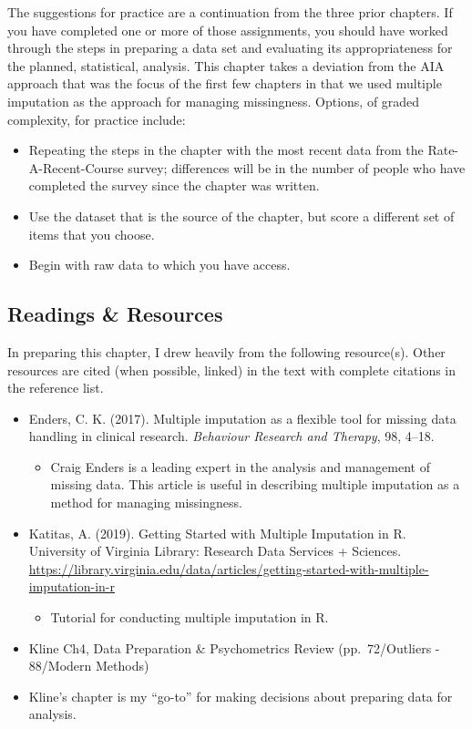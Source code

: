 \documentclass[
  11pt,
]{book}
\providecommand{\tightlist}{%
  \setlength{\itemsep}{0pt}\setlength{\parskip}{0pt}}
\begin{document}
The suggestions for practice are a continuation from the three prior chapters. If you have completed one or more of those assignments, you should have worked through the steps in preparing a data set and evaluating its appropriateness for the planned, statistical, analysis. This chapter takes a deviation from the AIA \citep{parent_handling_2013} approach that was the focus of the first few chapters in that we used multiple imputation as the approach for managing missingness. Options, of graded complexity, for practice include:

\begin{itemize}
\tightlist
\item
  Repeating the steps in the chapter with the most recent data from the Rate-A-Recent-Course survey; differences will be in the number of people who have completed the survey since the chapter was written.
\item
  Use the dataset that is the source of the chapter, but score a different set of items that you choose.
\item
  Begin with raw data to which you have access.
\end{itemize}

\hypertarget{readings-resources-3}{%
\subsection{Readings \& Resources}\label{readings-resources-3}}

In preparing this chapter, I drew heavily from the following resource(s). Other resources are cited (when possible, linked) in the text with complete citations in the reference list.

\begin{itemize}
\tightlist
\item
  Enders, C. K. (2017). Multiple imputation as a flexible tool for missing data handling in clinical research. \emph{Behaviour Research and Therapy}, 98, 4--18.

  \begin{itemize}
  \tightlist
  \item
    Craig Enders is a leading expert in the analysis and management of missing data. This article is useful in describing multiple imputation as a method for managing missingness.
  \end{itemize}
\item
  Katitas, A. (2019). Getting Started with Multiple Imputation in R. University of Virginia Library: Research Data Services + Sciences. \url{https://library.virginia.edu/data/articles/getting-started-with-multiple-imputation-in-r}

  \begin{itemize}
  \tightlist
  \item
    Tutorial for conducting multiple imputation in R.
  \end{itemize}
\item
  Kline Ch4, Data Preparation \& Psychometrics Review (pp.~72/Outliers - 88/Modern Methods)
\item
  Kline's chapter is my ``go-to'' for making decisions about preparing data for analysis.
\end{itemize}
\end{document}
